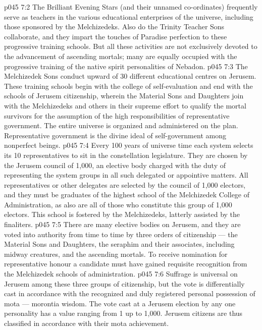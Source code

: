 \vs p045 7:2 The Brilliant Evening Stars (and their unnamed co\hyp{}ordinates) frequently serve as teachers in the various educational enterprises of the universe, including those sponsored by the Melchizedeks. Also do the Trinity Teacher Sons collaborate, and they impart the touches of Paradise perfection to these progressive training schools. But all these activities are not exclusively devoted to the advancement of ascending mortals; many are equally occupied with the progressive training of the native spirit personalities of Nebadon.
\vs p045 7:3 The Melchizedek Sons conduct upward of 30 different educational centres on Jerusem. These training schools begin with the college of self\hyp{}evaluation and end with the schools of Jerusem citizenship, wherein the Material Sons and Daughters join with the Melchizedeks and others in their supreme effort to qualify the mortal survivors for the assumption of the high responsibilities of representative government. The entire universe is organized and administered on the  plan. Representative government is the divine ideal of self\hyp{}government among nonperfect beings.
\vs p045 7:4 Every 100 years of universe time each system selects its 10 representatives to sit in the constellation legislature. They are chosen by the Jerusem council of 1,000, an elective body charged with the duty of representing the system groups in all such delegated or appointive matters. All representatives or other delegates are selected by the council of 1,000 electors, and they must be graduates of the highest school of the Melchizedek College of Administration, as also are all of those who constitute this group of 1,000 electors. This school is fostered by the Melchizedeks, latterly assisted by the finaliters.
\vs p045 7:5 \pc There are many elective bodies on Jerusem, and they are voted into authority from time to time by three orders of citizenship --- the Material Sons and Daughters, the seraphim and their associates, including midway creatures, and the ascending mortals. To receive nomination for representative honour a candidate must have gained requisite recognition from the Melchizedek schools of administration.
\vs p045 7:6 Suffrage is universal on Jerusem among these three groups of citizenship, but the vote is differentially cast in accordance with the recognized and duly registered personal possession of mota --- morontia wisdom. The vote cast at a Jerusem election by any one personality has a value ranging from 1 up to 1,000. Jerusem citizens are thus classified in accordance with their mota achievement.
